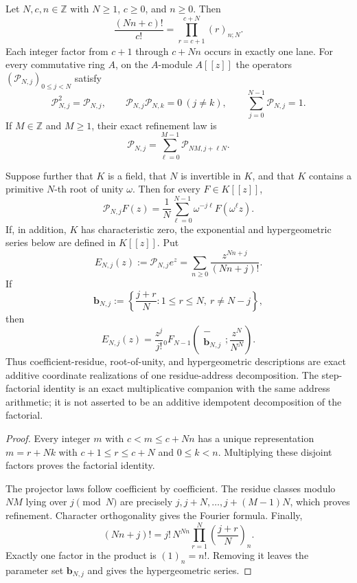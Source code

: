 \begin{theorem}
\label{thm:block15-factorial-residue-realization}
Let \(N,c,n\in\mathbb Z\) with \(N\ge1\), \(c\ge0\), and \(n\ge0\).
Then
\[
 \boxed{
 \frac{(Nn+c)!}{c!}
 =
 \prod_{r=c+1}^{c+N}(r)_{n;N}.}
\]
Each integer factor from \(c+1\) through \(c+Nn\) occurs in exactly one
lane.  For every commutative ring \(A\), on the \(A\)-module \(A[[z]]\) the
operators
\((\mathcal P_{N,j})_{0\le j<N}\) satisfy
\[
 \mathcal P_{N,j}^2=\mathcal P_{N,j},
 \qquad
 \mathcal P_{N,j}\mathcal P_{N,k}=0\ (j\ne k),
 \qquad
 \sum_{j=0}^{N-1}\mathcal P_{N,j}=1.
\]
If \(M\in\mathbb Z\) and \(M\ge1\), their exact refinement law is
\[
 \mathcal P_{N,j}
 =
 \sum_{\ell=0}^{M-1}\mathcal P_{NM,j+\ell N}.
\]

Suppose further that \(K\) is a field, that \(N\) is invertible in \(K\),
and that \(K\) contains a primitive \(N\)-th root of unity \(\omega\).  Then
for every \(F\in K[[z]]\),
\[
 \mathcal P_{N,j}F(z)
 =
 \frac1N\sum_{\ell=0}^{N-1}
 \omega^{-j\ell}F(\omega^\ell z).
\]
If, in addition, \(K\) has characteristic zero, the exponential and
hypergeometric series below are defined in \(K[[z]]\).  Put
\[
 E_{N,j}(z)
 :=\mathcal P_{N,j}e^z
 =\sum_{n\ge0}\frac{z^{Nn+j}}{(Nn+j)!}.
\]
If
\[
 \mathbf b_{N,j}
 :=
 \left\{
 \frac{j+r}{N}:1\le r\le N,
 \ r\ne N-j
 \right\},
\]
then
\[
 E_{N,j}(z)
 =
 \frac{z^j}{j!}
 {}_0F_{N-1}
 \left(
 \begin{matrix}-\\ \mathbf b_{N,j}\end{matrix};
 \frac{z^N}{N^N}
 \right).
\]
Thus coefficient-residue, root-of-unity, and hypergeometric descriptions are
exact additive coordinate realizations of one residue-address decomposition.
The step-factorial identity is an exact multiplicative companion with the
same address arithmetic; it is not asserted to be an additive idempotent
decomposition of the factorial.
\end{theorem}

\begin{proof}
Every integer \(m\) with \(c<m\le c+Nn\) has a unique representation
\(m=r+Nk\) with \(c+1\le r\le c+N\) and \(0\le k<n\).  Multiplying these
disjoint factors proves the factorial identity.

The projector laws follow coefficient by coefficient.  The residue classes
modulo \(NM\) lying over \(j\pmod N\) are precisely
\(j,j+N,\ldots,j+(M-1)N\), which proves refinement.  Character
orthogonality gives the Fourier formula.  Finally,
\[
 (Nn+j)!
 =
 j!\,N^{Nn}
 \prod_{r=1}^{N}\left(\frac{j+r}{N}\right)_n.
\]
Exactly one factor in the product is \((1)_n=n!\).  Removing it leaves the
parameter set \(\mathbf b_{N,j}\) and gives the hypergeometric series.
\end{proof}

